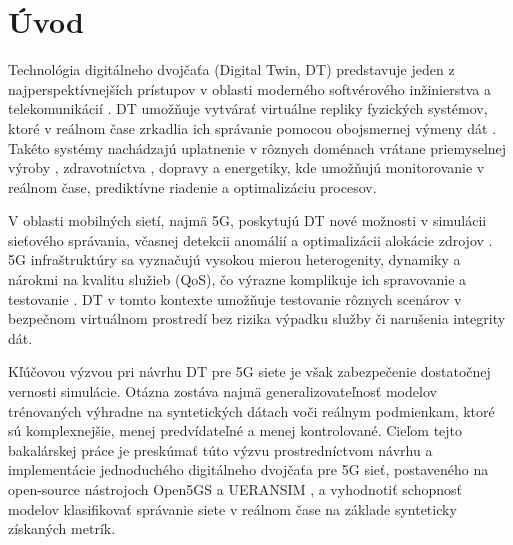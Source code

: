 \chapter{Úvod}
Technológia digitálneho dvojčaťa (Digital Twin, DT) predstavuje jeden z najperspektívnejších prístupov v oblasti moderného softvérového inžinierstva \cite{DimensionOfDTAplication} a telekomunikácií \cite{AplicationsOfDT}. DT umožňuje vytvárať virtuálne repliky fyzických systémov, ktoré v reálnom čase zrkadlia ich správanie pomocou obojsmernej výmeny dát \cite{real_time}. Takéto systémy nachádzajú uplatnenie v rôznych doménach vrátane priemyselnej výroby \cite{manufacturing}, zdravotníctva \cite{siemens_helthcare}, dopravy a energetiky, kde umožňujú monitorovanie v reálnom čase, prediktívne riadenie a optimalizáciu procesov.

V oblasti mobilných sietí, najmä 5G, poskytujú DT nové možnosti v simulácii sieťového správania, včasnej detekcii anomálií a optimalizácii alokácie zdrojov \cite{5gandbeyond}. 5G infraštruktúry sa vyznačujú vysokou mierou heterogenity, dynamiky a nárokmi na kvalitu služieb (QoS), čo výrazne komplikuje ich spravovanie a testovanie \cite{AplicationsOfDT}. DT v tomto kontexte umožňuje testovanie rôznych scenárov v bezpečnom virtuálnom prostredí bez rizika výpadku služby či narušenia integrity dát.

Kľúčovou výzvou pri návrhu DT pre 5G siete je však zabezpečenie dostatočnej vernosti simulácie. Otázna zostáva najmä generalizovateľnosť modelov trénovaných výhradne na syntetických dátach voči reálnym podmienkam, ktoré sú komplexnejšie, menej predvídateľné a menej kontrolované. Cieľom tejto bakalárskej práce je preskúmať túto výzvu prostredníctvom návrhu a implementácie jednoduchého digitálneho dvojčaťa pre 5G sieť, postaveného na open-source nástrojoch Open5GS \cite{open5gs} a UERANSIM \cite{ueransim}, a vyhodnotiť schopnosť modelov klasifikovať správanie siete v reálnom čase na základe synteticky získaných metrík.